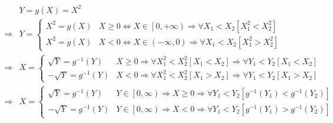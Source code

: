 \documentclass[
]{book}
\theoremstyle{definition}
\theoremstyle{definition}
\theoremstyle{definition}
\theoremstyle{definition}
\theoremstyle{remark}
\begin{document}
\[
\begin{aligned}
 & Y=g\left(X\right)=X^{2}\\
\Rightarrow & Y=\begin{cases}
X^{2}=g\left(X\right) & X\ge0\Leftrightarrow X\in\left[0,+\infty\right)\Rightarrow\forall X_{{\scriptscriptstyle 1}}<X_{{\scriptscriptstyle 2}}\left[X_{{\scriptscriptstyle 1}}^{2}<X_{{\scriptscriptstyle 2}}^{2}\right]\\
X^{2}=g\left(X\right) & X<0\Leftrightarrow X\in\left(-\infty,0\right)\Rightarrow\forall X_{{\scriptscriptstyle 1}}<X_{{\scriptscriptstyle 2}}\left[X_{{\scriptscriptstyle 1}}^{2}>X_{{\scriptscriptstyle 2}}^{2}\right]
\end{cases}\\
\Rightarrow & X=\begin{cases}
\sqrt{Y}=g^{-1}\left(Y\right) & X\ge0\Rightarrow\forall X_{{\scriptscriptstyle 1}}^{2}<X_{{\scriptscriptstyle 2}}^{2}\left[X_{{\scriptscriptstyle 1}}<X_{{\scriptscriptstyle 2}}\right]\Rightarrow\forall Y_{{\scriptscriptstyle 1}}<Y_{{\scriptscriptstyle 2}}\left[X_{{\scriptscriptstyle 1}}<X_{{\scriptscriptstyle 2}}\right]\\
-\sqrt{Y}=g^{-1}\left(Y\right) & X<0\Rightarrow\forall X_{{\scriptscriptstyle 1}}^{2}<X_{{\scriptscriptstyle 2}}^{2}\left[X_{{\scriptscriptstyle 1}}>X_{{\scriptscriptstyle 2}}\right]\Rightarrow\forall Y_{{\scriptscriptstyle 1}}<Y_{{\scriptscriptstyle 2}}\left[X_{{\scriptscriptstyle 1}}>X_{{\scriptscriptstyle 2}}\right]
\end{cases}\\
\Rightarrow & X=\begin{cases}
\sqrt{Y}=g^{-1}\left(Y\right) & Y\in\left[0,\infty\right)\Rightarrow X\ge0\Rightarrow\forall Y_{{\scriptscriptstyle 1}}<Y_{{\scriptscriptstyle 2}}\left[g^{-1}\left(Y_{{\scriptscriptstyle 1}}\right)<g^{-1}\left(Y_{{\scriptscriptstyle 2}}\right)\right]\\
-\sqrt{Y}=g^{-1}\left(Y\right) & Y\in\left[0,\infty\right)\Rightarrow X<0\Rightarrow\forall Y_{{\scriptscriptstyle 1}}<Y_{{\scriptscriptstyle 2}}\left[g^{-1}\left(Y_{{\scriptscriptstyle 1}}\right)>g^{-1}\left(Y_{{\scriptscriptstyle 2}}\right)\right]
\end{cases}
\end{aligned}
\]
\end{document}
